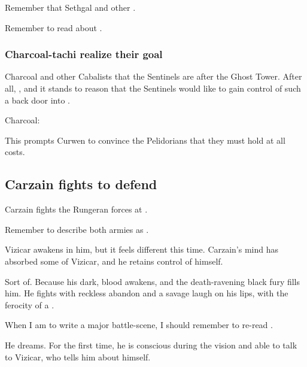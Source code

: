 Remember that Sethgal and other . 

Remember to read about . 





\subsubsection{Charcoal-tachi realize their goal}
Charcoal and other Cabalists  that the Sentinels are after the Ghost Tower. 
After all, , and it stands to reason that the Sentinels would like to gain control of such a back door into \Nyx. 

\begin{prose}
  Charcoal:
\end{prose}

This prompts Curwen to convince the Pelidorians that they must hold \Forclin{} at all costs. 







\subsection{Carzain fights to defend \Forclin}
Carzain fights the Rungeran forces at \Forclin. 

Remember to describe both armies as .

Vizicar awakens in him, but it feels different this time. 
Carzain's mind has absorbed some of Vizicar, and he retains control of himself. 

Sort of. 
Because his dark, \draconic{} blood awakens, and the death-ravening black fury fills him. 
He fights with reckless abandon and a savage laugh on his lips, with the ferocity of a \dragon{}. 

When I am to write a major battle-scene, I should remember to re-read . 

He dreams. 
For the first time, he is conscious during the vision and able to talk to Vizicar, who tells him about himself. 


